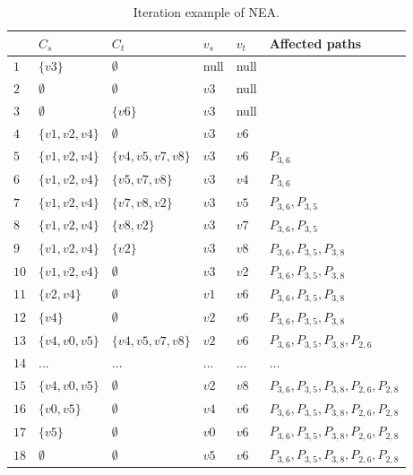 \begin{table}[htbp]
	\centering
	\caption{Iteration example of NEA.}
	\begin{tabular}{|l|l|l|l|l|l|}
    \hline
     & $C_s$ & $C_t$ & $v_s$ & $v_t$ & Affected paths \\
    \hline
    $1$ & $\{v3\}$ 		  & $\emptyset$ 	  & null & null &  \\
    $2$ & $\emptyset$	  & $\emptyset$       & $v3$ & null &  \\
    $3$ & $\emptyset$  & $\{v6\}$          & $v3$ & null &  \\
	$4$ & $\{v1,v2,v4\}$  & $\emptyset$ 	  & $v3$ & $v6$ &  \\
    $5$ & $\{v1,v2,v4\}$  & $\{v4,v5,v7,v8\}$ & $v3$ & $v6$ & $P_{3,6}$ \\
    $6$ & $\{v1,v2,v4\}$  & $\{v5,v7,v8\}$    & $v3$ & $v4$ & $P_{3,6}$ \\
    $7$ & $\{v1,v2,v4\}$  & $\{v7,v8,v2\}$ 	  & $v3$ & $v5$ & $P_{3,6},P_{3,5}$ \\
    $8$ & $\{v1,v2,v4\}$  & $\{v8,v2\}$ 	  & $v3$ & $v7$ & $P_{3,6},P_{3,5}$ \\
    $9$ & $\{v1,v2,v4\}$ & $\{v2\}$ 		  & $v3$ & $v8$ & $P_{3,6},P_{3,5},P_{3,8}$ \\
    $10$ & $\{v1,v2,v4\}$ & $\emptyset$ 	  & $v3$ & $v2$ & $P_{3,6},P_{3,5},P_{3,8}$ \\
    $11$ & $\{v2,v4\}$ 	  & $\emptyset$ 	  & $v1$ & $v6$ & $P_{3,6},P_{3,5},P_{3,8}$ \\
    $12$ & $\{v4\}$		  & $\emptyset$ 	  & $v2$ & $v6$ & $P_{3,6},P_{3,5},P_{3,8}$ \\
    $13$ & $\{v4,v0,v5\}$		  & $\{v4,v5,v7,v8\}$ & $v2$ & $v6$ & $P_{3,6},P_{3,5},P_{3,8},P_{2,6}$ \\
    $14$ & $...$		  & $...$ 	  &... & ... & ... \\
    $15$ & $\{v4,v0,v5\}$    & $\emptyset$ 	  & $v2$ & $v8$ & $P_{3,6},P_{3,5},P_{3,8},P_{2,6},P_{2,8}$ \\
    $16$ & $\{v0,v5\}$ 	  & $\emptyset$ 	  & $v4$ & $v6$ & $P_{3,6},P_{3,5},P_{3,8},P_{2,6},P_{2,8}$  \\
    $17$ & $\{v5\}$ 	  & $\emptyset$ 	  & $v0$ & $v6$ & $P_{3,6},P_{3,5},P_{3,8},P_{2,6},P_{2,8}$  \\
    $18$ & $\emptyset$ 	  & $\emptyset$ 	  & $v5$ & $v6$ & $P_{3,6},P_{3,5},P_{3,8},P_{2,6},P_{2,8}$  \\
    \hline
    \end{tabular}
    \label{tab:algo1}
\end{table}

